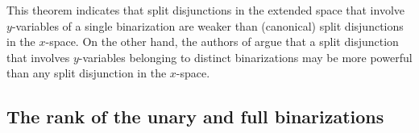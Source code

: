 \documentclass[11pt,a4paper]{article}
\newtheorem{observation}[theorem]{Observation}
\newcommand{\conv}{\operatorname{conv}}
\newcommand{\1}{\textbf{1}}
\newcommand{\rk}{\operatorname{rk}}
\begin{document}
This theorem indicates that split disjunctions in the extended space that involve $y$-variables of a single binarization are weaker than (canonical) split disjunctions in the $x$-space. On the other hand, the authors of \cite{dash2018binary} argue that a split disjunction that involves $y$-variables belonging to distinct binarizations may be more powerful than any split disjunction in the $x$-space. 






\subsection{The rank of the unary and full binarizations}

\end{document}

